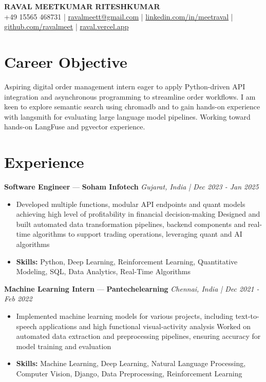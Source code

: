 \documentclass[a4paper,10pt]{article}
\begin{document}
\begin{center}
  {\Large\bfseries RAVAL MEETKUMAR RITESHKUMAR}\\[2pt]
  {\small +49 15565 468731 \;|\; \href{mailto:ravalmeett@gmail.com}{ravalmeett@gmail.com} \;|\; \href{https://www.linkedin.com/in/meetraval/}{linkedin.com/in/meetraval} \;|\; \href{https://github.com/ravalmeet}{github.com/ravalmeet} \;|\; \href{https://raval.vercel.app/}{raval.vercel.app}}
\end{center}
\vspace{-3pt}

\section*{Career Objective}
Aspiring digital order management intern eager to apply Python-driven API integration and asynchronous programming to streamline order workflows. I am keen to explore semantic search using chromadb and to gain hands-on experience with langsmith for evaluating large language model pipelines. Working toward hands-on LangFuse and pgvector experience.\par

\section*{Experience}
\textbf{Software Engineer} — \textbf{Soham Infotech} \hfill \textit{Gujarat, India \;|\; Dec 2023 - Jan 2025}\par
\vspace{1pt}
\begin{itemize}
  \item Developed multiple functions, modular API endpoints and quant models achieving high level of profitability in financial decision-making Designed and built automated data transformation pipelines, backend components and real-time algorithms to support trading operations, leveraging quant and AI algorithms
  \item \textbf{Skills:} Python, Deep Learning, Reinforcement Learning, Quantitative Modeling, SQL, Data Analytics, Real-Time Algorithms
\end{itemize}
\vspace{3pt}
\textbf{Machine Learning Intern} — \textbf{Pantechelearning} \hfill \textit{Chennai, India \;|\; Dec 2021 - Feb 2022}\par
\vspace{1pt}
\begin{itemize}
  \item Implemented machine learning models for various projects, including text-to-speech applications and high functional visual-activity analysis Worked on automated data extraction and preprocessing pipelines, ensuring accuracy for model training and evaluation
  \item \textbf{Skills:} Machine Learning, Deep Learning, Natural Language Processing, Computer Vision, Django, Data Preprocessing, Reinforcement Learning
\end{itemize}
\end{document}
